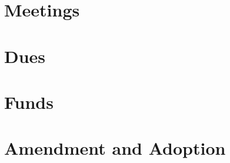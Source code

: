 \documentclass[bylaws,final,10pt,withoutoptional,withoutpreface]{../bylaws}
\begin{document}
\chapter{Meetings}\label{sec:meetings}


\chapter{Dues}\label{sec:dues}


\chapter{Funds}\label{sec:funds}



\chapter{Amendment and Adoption}\label{sec:amendment}



\appendix

\end{document}

